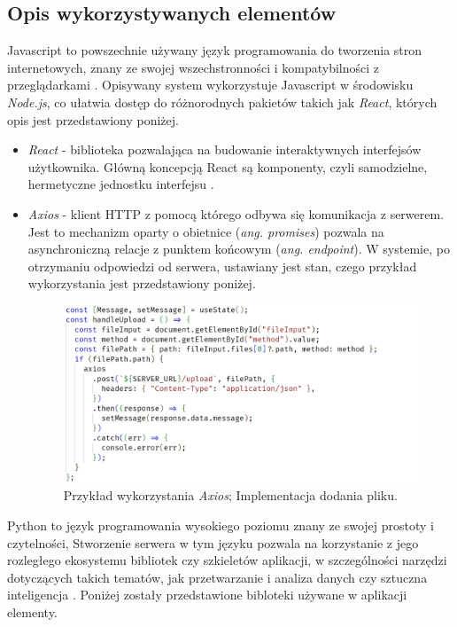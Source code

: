 \documentclass[12pt,a4paper,twoside]{article}
\begin{document}
\subsection{Opis wykorzystywanych elementów}
Javascript to powszechnie używany język programowania do tworzenia stron internetowych, znany ze swojej wszechstronności i kompatybilności z przeglądarkami \cite{javascript}. Opisywany system wykorzystuje Javascript w środowisku \textit{Node.js}, co ułatwia dostęp do różnorodnych pakietów takich jak \textit{React}, których opis jest przedstawiony poniżej.
\begin{itemize}
	\item \textit{React} - biblioteka pozwalająca na budowanie interaktywnych interfejsów użytkownika. Główną koncepcją React są komponenty, czyli samodzielne, hermetyczne jednostku interfejsu \cite{reactjs}.
	\item \textit{Axios} - klient HTTP z pomocą którego odbywa się komunikacja z serwerem. Jest to mechanizm oparty o obietnice (\textit{ang. promises}) pozwala na asynchroniczną relacje z punktem końcowym (\textit{ang. endpoint}). W systemie, po otrzymaniu odpowiedzi od serwera, ustawiany jest stan, czego przykład wykorzystania jest przedstawiony poniżej.
\begin{figure}[h!]
\centering
\includegraphics[width=\textwidth]{img/axios.jpg}
\caption{Przykład wykorzystania \textit{Axios}; Implementacja dodania pliku.}
\end{figure}
\end{itemize}\par
\newpage
Python to język programowania wysokiego poziomu znany ze swojej prostoty i czytelności,
Stworzenie serwera w tym języku pozwala na korzystanie z jego rozległego ekosystemu bibliotek czy szkieletów aplikacji, w szczególności narzędzi dotyczących takich tematów, jak przetwarzanie i analiza danych czy sztuczna inteligencja \cite{python}. Poniżej zostały przedstawione bibloteki używane w aplikacji elementy.
\end{document}
